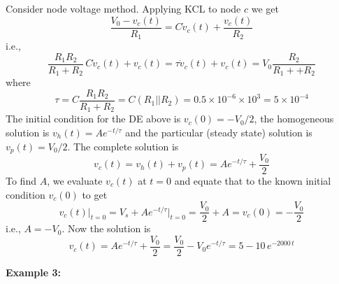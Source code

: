 \documentclass{article}
\begin{document}
Consider node voltage method. Applying KCL to node $c$ 
we get
\begin{equation}
\frac{V_0-v_c(t)}{R_1}=C\dot{v}_c(t)+\frac{v_c(t)}{R_2}
\end{equation}
i.e.,
\begin{equation}
\frac{R_1R_2}{R_1+R_2}\,C\dot{v}_c(t)+v_c(t)
=\tau\dot{v}_c(t)+v_c(t)=V_0\frac{R_2}{R_1++R_2}
\end{equation}
where 
\begin{equation}
\tau=C\frac{R_1R_2}{R_1+R_2}=C(R_1||R_2)
=0.5\times 10^{-6}\times 10^3=5\times 10^{-4}
\end{equation}
The initial condition for the DE above is $v_c(0)=-V_0/2$, the
homogeneous solution is $v_h(t)=Ae^{-t/\tau}$ and the particular 
(steady state) solution is $v_p(t)=V_0/2$. The complete solution 
is 
\begin{equation}
v_c(t)=v_h(t)+v_p(t)=Ae^{-t/\tau}+\frac{V_0}{2}
\end{equation}
To find $A$, we evaluate $v_c(t)$ at $t=0$ and equate that to the
known initial condition $v_c(0)$ to get
\begin{equation}
v_c(t)\bigg|_{t=0}=V_s+Ae^{-t/\tau}\bigg|_{t=0}=\frac{V_0}{2}+A
=v_c(0)=-\frac{V_0}{2}
\end{equation}
i.e., $A=-V_0$. Now the solution is
\begin{equation}
v_c(t)=Ae^{-t/\tau}+\frac{V_0}{2}
=\frac{V_0}{2}-V_0 e^{-t/\tau}=5-10\,e^{-2000\,t}
\end{equation}

{\bf Example 3:}
\end{document}
